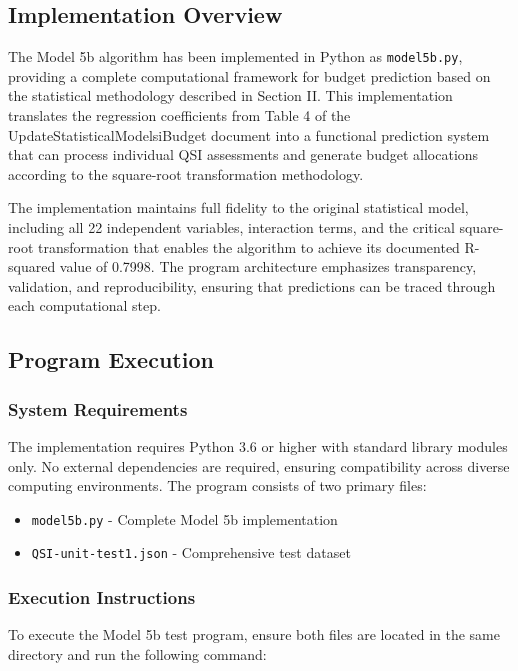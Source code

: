 \subsection{Implementation Overview}

The Model 5b algorithm has been implemented in Python as \texttt{model5b.py}, providing a complete computational framework for budget prediction based on the statistical methodology described in Section II. This implementation translates the regression coefficients from Table 4 of the UpdateStatisticalModelsiBudget document into a functional prediction system that can process individual QSI assessments and generate budget allocations according to the square-root transformation methodology.

The implementation maintains full fidelity to the original statistical model, including all 22 independent variables, interaction terms, and the critical square-root transformation that enables the algorithm to achieve its documented R-squared value of 0.7998. The program architecture emphasizes transparency, validation, and reproducibility, ensuring that predictions can be traced through each computational step.

\subsection{Program Execution}

\subsubsection{System Requirements}

The implementation requires Python 3.6 or higher with standard library modules only. No external dependencies are required, ensuring compatibility across diverse computing environments. The program consists of two primary files:

\begin{itemize}
    \item \texttt{model5b.py} - Complete Model 5b implementation
    \item \texttt{QSI-unit-test1.json} - Comprehensive test dataset
\end{itemize}

\subsubsection{Execution Instructions}

To execute the Model 5b test program, ensure both files are located in the same directory and run the following command:

